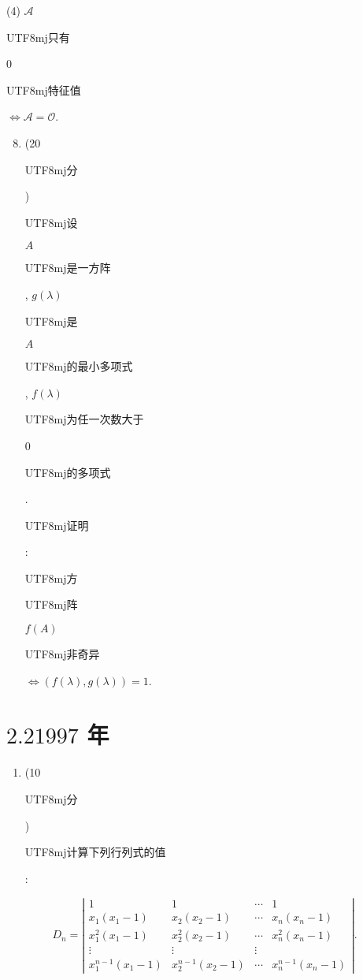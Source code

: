 \documentclass[10pt]{article}
\begin{document}
(4) $\mathscr{A}$ \begin{CJK}{UTF8}{mj}只有\end{CJK} 0 \begin{CJK}{UTF8}{mj}特征值\end{CJK} $\Leftrightarrow \mathscr{A}=\mathscr{O}$.

\begin{enumerate}
  \setcounter{enumi}{7}
  \item (20 \begin{CJK}{UTF8}{mj}分\end{CJK}) \begin{CJK}{UTF8}{mj}设\end{CJK} $A$ \begin{CJK}{UTF8}{mj}是一方阵\end{CJK}, $g(\lambda)$ \begin{CJK}{UTF8}{mj}是\end{CJK} $A$ \begin{CJK}{UTF8}{mj}的最小多项式\end{CJK}, $f(\lambda)$ \begin{CJK}{UTF8}{mj}为任一次数大于\end{CJK} 0 \begin{CJK}{UTF8}{mj}的多项式\end{CJK}. \begin{CJK}{UTF8}{mj}证明\end{CJK}: \begin{CJK}{UTF8}{mj}方\end{CJK} \begin{CJK}{UTF8}{mj}阵\end{CJK} $f(A)$ \begin{CJK}{UTF8}{mj}非奇异\end{CJK} $\Leftrightarrow(f(\lambda), g(\lambda))=1$.
\end{enumerate}
\section{$2.21997$ 年}
\begin{enumerate}
  \item (10 \begin{CJK}{UTF8}{mj}分\end{CJK}) \begin{CJK}{UTF8}{mj}计算下列行列式的值\end{CJK}:
\end{enumerate}
$$
D_{n}=\left|\begin{array}{cccc}
1 & 1 & \cdots & 1 \\
x_{1}\left(x_{1}-1\right) & x_{2}\left(x_{2}-1\right) & \cdots & x_{n}\left(x_{n}-1\right) \\
x_{1}^{2}\left(x_{1}-1\right) & x_{2}^{2}\left(x_{2}-1\right) & \cdots & x_{n}^{2}\left(x_{n}-1\right) \\
\vdots & \vdots & \vdots \\
x_{1}^{n-1}\left(x_{1}-1\right) & x_{2}^{n-1}\left(x_{2}-1\right) & \cdots & x_{n}^{n-1}\left(x_{n}-1\right)
\end{array}\right| .
$$
\end{document}
